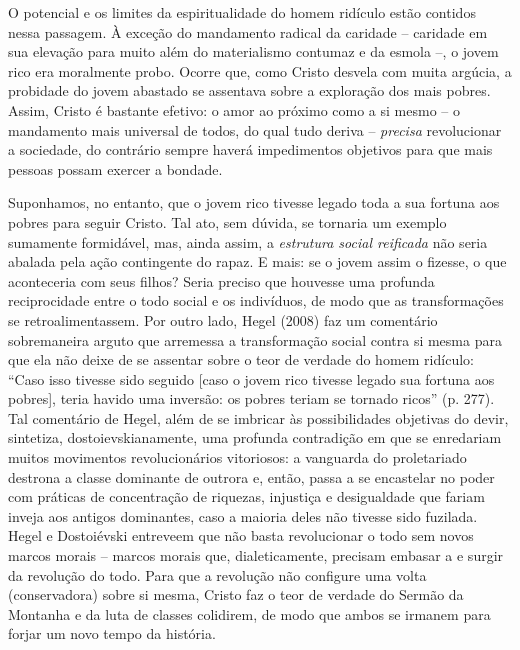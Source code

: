 O potencial e os limites da espiritualidade do homem ridículo estão
contidos nessa passagem. À exceção do mandamento radical da caridade --
caridade em sua elevação para muito além do materialismo contumaz e da
esmola --, o jovem rico era moralmente probo. Ocorre que, como Cristo
desvela com muita argúcia, a probidade do jovem abastado se assentava
sobre a exploração dos mais pobres. Assim, Cristo é bastante efetivo: o
amor ao próximo como a si mesmo -- o mandamento mais universal de todos,
do qual tudo deriva -- \emph{precisa} revolucionar a sociedade, do
contrário sempre haverá impedimentos objetivos para que mais pessoas
possam exercer a bondade.

Suponhamos, no entanto, que o jovem rico tivesse legado toda a sua
fortuna aos pobres para seguir Cristo. Tal ato, sem dúvida, se tornaria
um exemplo sumamente formidável, mas, ainda assim, a \emph{estrutura
social reificada} não seria abalada pela ação contingente do rapaz. E
mais: se o jovem assim o fizesse, o que aconteceria com seus filhos?
Seria preciso que houvesse uma profunda reciprocidade entre o todo
social e os indivíduos, de modo que as transformações se
retroalimentassem. Por outro lado, Hegel (2008) faz um comentário
sobremaneira arguto que arremessa a transformação social contra si mesma
para que ela não deixe de se assentar sobre o teor de verdade do homem
ridículo: ``Caso isso tivesse sido seguido {[}caso o jovem rico tivesse
legado sua fortuna aos pobres{]}, teria havido uma inversão: os pobres
teriam se tornado ricos'' (p. 277). Tal comentário de Hegel, além de se
imbricar às possibilidades objetivas do devir, sintetiza,
dostoievskianamente, uma profunda contradição em que se enredariam
muitos movimentos revolucionários vitoriosos: a vanguarda do
proletariado destrona a classe dominante de outrora e, então, passa a se
encastelar no poder com práticas de concentração de riquezas, injustiça
e desigualdade que fariam inveja aos antigos dominantes, caso a maioria
deles não tivesse sido fuzilada. Hegel e Dostoiévski entreveem que não
basta revolucionar o todo sem novos marcos morais -- marcos morais que,
dialeticamente, precisam embasar a e surgir da revolução do todo. Para
que a revolução não configure uma volta (conservadora) sobre si mesma,
Cristo faz o teor de verdade do Sermão da Montanha e da luta de classes
colidirem, de modo que ambos se irmanem para forjar um novo tempo da
história.

